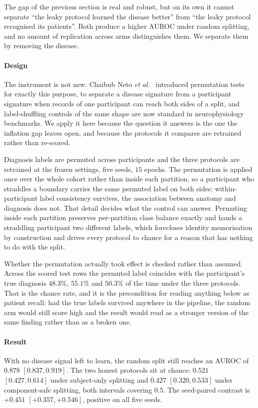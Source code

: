 \documentclass[11pt]{article}
\newcommand{\etal}{\textit{et al.}}
\begin{document}
The gap of the previous section is real and robust, but on its own it
cannot separate ``the leaky protocol learned the disease better'' from
``the leaky protocol recognised its patients''. Both produce a higher
AUROC under random splitting, and no amount of replication across arms
distinguishes them. We separate them by removing the disease.

\paragraph{Design}
The instrument is not new. Chaibub Neto \etal~\cite{chaibubneto2017permutation}
introduced permutation tests for exactly this purpose, to separate a disease
signature from a participant signature when records of one participant can
reach both sides of a split, and label-shuffling controls of the same shape are
now standard in neurophysiology benchmarks. We apply it here because the
question it answers is the one the inflation gap leaves open, and because the
protocols it compares are retrained rather than re-scored.

Diagnosis labels are permuted across participants and the three protocols
are retrained at the frozen settings, five seeds, $15$ epochs. The
permutation is applied once over the whole cohort rather than inside each
partition, so a participant who straddles a boundary carries the same
permuted label on both sides: within-participant label consistency
survives, the association between anatomy and diagnosis does not. That
detail decides what the control can answer. Permuting inside each
partition preserves per-partition class balance exactly and hands a
straddling participant two different labels, which forecloses identity
memorisation by construction and drives every protocol to chance for a
reason that has nothing to do with the split.

Whether the permutation actually took effect is checked rather than
assumed. Across the scored test rows the permuted label coincides with the
participant's true diagnosis $48.3\%$, $55.1\%$ and $50.3\%$ of the time
under the three protocols. That is the chance rate, and it is the
precondition for reading anything below as patient recall: had the true
labels survived anywhere in the pipeline, the random arm would still score
high and the result would read as a stronger version of the same finding
rather than as a broken one.

\paragraph{Result}
With no disease signal left to learn, the random split still reaches an
AUROC of $0.878$ $[0.837, 0.919]$. The two honest protocols sit at chance:
$0.521$ $[0.427, 0.614]$ under subject-only splitting and $0.427$
$[0.320, 0.533]$ under component-safe splitting, both intervals covering
$0.5$. The seed-paired contrast is $+0.451$ $[+0.357, +0.546]$, positive on
all five seeds.
\end{document}
